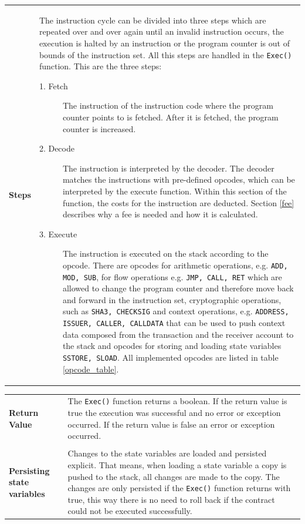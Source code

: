 \begin{tabular}[t]{ p{3cm} p{12.5cm}}
\textbf{Steps} &
The instruction cycle can be divided into three steps which are repeated over and over again until an invalid instruction occurs, the execution is halted by an instruction or the program counter is out of bounds of the instruction set. All this steps are handled in the \texttt{Exec()} function. This are the three steps:
\begin{description}
  \item[1. Fetch] The instruction of the instruction code where the program counter points to is fetched. After it is fetched, the program counter is increased.
  \item[2. Decode] The instruction is interpreted by the decoder. The decoder matches the instructions with pre-defined opcodes, which can be interpreted by the execute function. Within this section of the function, the costs for the instruction are deducted. Section \ref{fee} describes why a fee is needed and how it is calculated.
    \item[3. Execute] The instruction is executed on the stack according to the opcode. There are opcodes for arithmetic operations, e.g. \texttt{ADD, MOD, SUB}, for flow operations e.g. \texttt{JMP, CALL, RET} which are allowed to change the program counter and therefore move back and forward in the instruction set, cryptographic operations, such as \texttt{SHA3, CHECKSIG} and context operations, e.g. \texttt{ADDRESS, ISSUER, CALLER, CALLDATA} that can be used to push context data composed from the transaction and the receiver account to the stack and opcodes for storing and loading state variables \texttt{SSTORE, SLOAD}. All implemented opcodes are listed in table \ref{opcode_table}.
    \end{description}    
\end{tabular}

\begin{tabular}[t]{ p{3cm} p{12.5cm}}
\raggedright
\textbf{Return Value} &
The \texttt{Exec()} function returns a boolean. If the return value is true the execution was successful and no error or exception occurred. If the return value is false an error or exception occurred. \\ \\

\textbf{Persisting state variables} &
Changes to the state variables are loaded and persisted explicit. That means, when loading a state variable a copy is pushed to the stack, all changes are made to the copy. The changes are only persisted if the \texttt{Exec()} function returns with true, this way there is no need to roll back if the contract could not be executed successfully.
\end{tabular}

